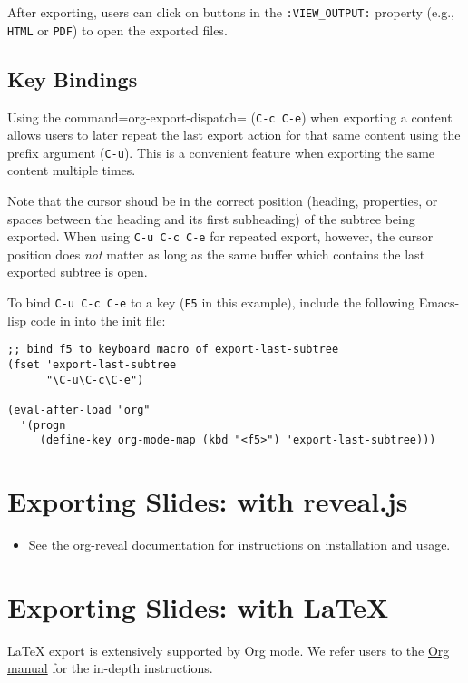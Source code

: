\documentclass[10pt,article]{article}
\begin{document}
After exporting, users can click on buttons in the \texttt{:VIEW\_OUTPUT:}
property (e.g., \texttt{HTML} or \texttt{PDF}) to open the exported files.

\subsection{Key Bindings}
\label{sec:org15d9e48}
Using the command=org-export-dispatch= (\texttt{C-c C-e}) when exporting a
content allows users to later repeat the last export action for that
same content using the prefix argument (\texttt{C-u}). This is a convenient
feature when exporting the same content multiple times.

\vspace{5 mm}

\begin{mdframed}
Note that the cursor shoud be in the correct position (heading,
properties, or spaces between the heading and its first subheading) of
the subtree being exported. When using \texttt{C-u C-c C-e} for repeated
export, however, the cursor position does \emph{not} matter as long as the
same buffer which contains the last exported subtree is open.
\end{mdframed}

\vspace{5 mm}

To bind \texttt{C-u C-c C-e} to a key (\texttt{F5} in this example), include
the following Emacs-lisp code in into the init file:

\begin{verbatim}
;; bind f5 to keyboard macro of export-last-subtree
(fset 'export-last-subtree
      "\C-u\C-c\C-e")

(eval-after-load "org"
  '(progn
     (define-key org-mode-map (kbd "<f5>") 'export-last-subtree)))
\end{verbatim}
\section{Exporting Slides: with reveal.js}
\label{sec:orgec5bdcb}
\begin{itemize}
\item See the \href{https://github.com/yjwen/org-reveal/}{org-reveal documentation} for instructions on installation and usage.
\end{itemize}
\section{Exporting Slides: with \LaTeX{}}
\label{sec:org59e7735}
\LaTeX{} export is extensively supported by Org mode. We refer users to the \href{https://orgmode.org/manual/LaTeX-export.html\#LaTeX-export}{Org
manual} for the in-depth instructions.
\end{document}
